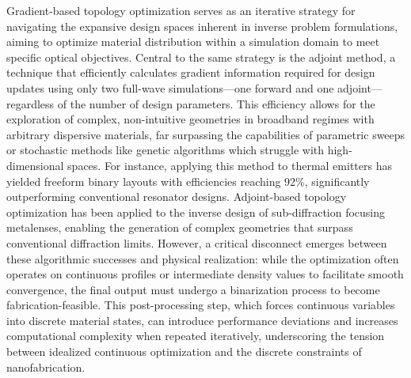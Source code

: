 \documentclass[11pt]{article}
\begin{document}
Gradient-based topology optimization serves as an iterative strategy for navigating the expansive design spaces inherent in inverse problem formulations, aiming to optimize material distribution within a simulation domain to meet specific optical objectives. Central to the same strategy is the adjoint method, a technique that efficiently calculates gradient information required for design updates using only two full-wave simulations---one forward and one adjoint---regardless of the number of design parameters. \citep{doi_10_1088_1367_2630_acfcd6_32444f17} This efficiency allows for the exploration of complex, non-intuitive geometries in broadband regimes with arbitrary dispersive materials, far surpassing the capabilities of parametric sweeps or stochastic methods like genetic algorithms which struggle with high-dimensional spaces. For instance, applying this method to thermal emitters has yielded freeform binary layouts with efficiencies reaching 92\%, significantly outperforming conventional resonator designs. Adjoint-based topology optimization has been applied to the inverse design of sub-diffraction focusing metalenses, enabling the generation of complex geometries that surpass conventional diffraction limits. \citep{doi_10_1088_1367_2630_acfcd6_32444f17} However, a critical disconnect emerges between these algorithmic successes and physical realization: while the optimization often operates on continuous profiles or intermediate density values to facilitate smooth convergence, the final output must undergo a binarization process to become fabrication-feasible. This post-processing step, which forces continuous variables into discrete material states, can introduce performance deviations and increases computational complexity when repeated iteratively, underscoring the tension between idealized continuous optimization and the discrete constraints of nanofabrication. \citep{doi_10_48550_arxiv_2603_15210_fdcfb92f} \citep{doi_10_1021_acsphotonics_3c00572_fda8f742} \citep{doi_10_1002_adom_202500249_9967e710}
\end{document}
